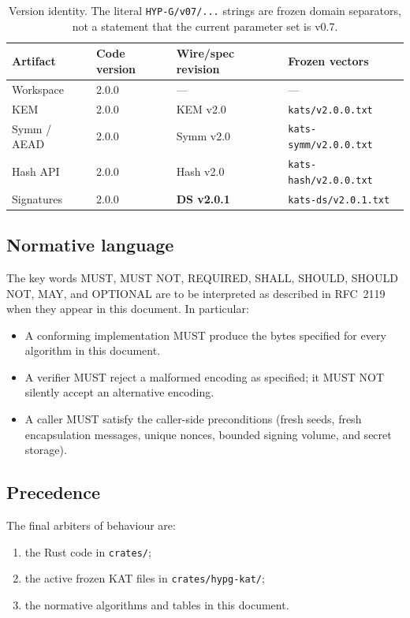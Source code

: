 \documentclass[11pt,a4paper]{article}
\theoremstyle{plain}
\theoremstyle{definition}
\theoremstyle{remark}
\begin{document}
\begin{table}[t]
\centering
\small
\begin{tabular}{@{}llll@{}}
\toprule
Artifact & Code version & Wire/spec revision & Frozen vectors \\
\midrule
Workspace & 2.0.0 & --- & --- \\
KEM & 2.0.0 & KEM v2.0 & \texttt{kats/v2.0.0.txt} \\
Symm / AEAD & 2.0.0 & Symm v2.0 & \texttt{kats-symm/v2.0.0.txt} \\
Hash API & 2.0.0 & Hash v2.0 & \texttt{kats-hash/v2.0.0.txt} \\
Signatures & 2.0.0 & \textbf{DS v2.0.1} & \texttt{kats-ds/v2.0.1.txt} \\
\bottomrule
\end{tabular}
\caption{Version identity.  The literal \texttt{HYP-G/v07/...} strings
are frozen domain separators, not a statement that the current
parameter set is v0.7.}
\label{tab:versions}
\end{table}

\subsection{Normative language}

The key words MUST, MUST NOT, REQUIRED, SHALL, SHOULD, SHOULD NOT, MAY,
and OPTIONAL are to be interpreted as described in RFC~2119~\cite{rfc2119}
when they appear in this document.  In particular:

\begin{itemize}[leftmargin=*]
\item A conforming implementation MUST produce the bytes specified for
  every algorithm in this document.
\item A verifier MUST reject a malformed encoding as specified; it MUST
  NOT silently accept an alternative encoding.
\item A caller MUST satisfy the caller-side preconditions (fresh seeds,
  fresh encapsulation messages, unique nonces, bounded signing volume,
  and secret storage).
\end{itemize}

\subsection{Precedence}

The final arbiters of behaviour are:

\begin{enumerate}[leftmargin=*]
\item the Rust code in \texttt{crates/};
\item the active frozen KAT files in \texttt{crates/hypg-kat/};
\item the normative algorithms and tables in this document.
\end{enumerate}
\end{document}
